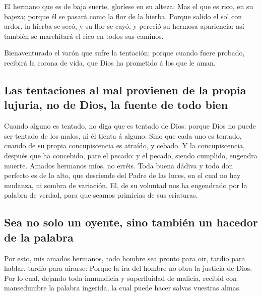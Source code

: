  El hermano que es de baja suerte, gloríese en su alteza:
 Mas el que es rico, en su bajeza; porque él se pasará
como la flor de la hierba.  Porque salido el sol con
ardor, la hierba se secó, y su flor se cayó, y pereció su hermosa
apariencia: así también se marchitará el rico en todos sus caminos.

 Bienaventurado el varón que sufre la tentación; porque
cuando fuere probado, recibirá la corona de vida, que Dios ha prometido
á los que le aman.

\hypertarget{las-tentaciones-al-mal-provienen-de-la-propia-lujuria-no-de-dios-la-fuente-de-todo-bien}{%
\subsection{Las tentaciones al mal provienen de la propia lujuria, no de
Dios, la fuente de todo
bien}\label{las-tentaciones-al-mal-provienen-de-la-propia-lujuria-no-de-dios-la-fuente-de-todo-bien}}

 Cuando alguno es tentado, no diga que es tentado de
Dios: porque Dios no puede ser tentado de los malos, ni él tienta á
alguno:  Sino que cada uno es tentado, cuando de su
propia concupiscencia es atraído, y cebado.  Y la
concupiscencia, después que ha concebido, pare el pecado: y el pecado,
siendo cumplido, engendra muerte.  Amados hermanos míos,
no erréis.  Toda buena dádiva y todo don perfecto es de
lo alto, que desciende del Padre de las luces, en el cual no hay
mudanza, ni sombra de variación.  El, de su voluntad nos
ha engendrado por la palabra de verdad, para que seamos primicias de sus
criaturas.

\hypertarget{sea-no-solo-un-oyente-sino-tambiuxe9n-un-hacedor-de-la-palabra}{%
\subsection{Sea no solo un oyente, sino también un hacedor de la
palabra}\label{sea-no-solo-un-oyente-sino-tambiuxe9n-un-hacedor-de-la-palabra}}

 Por esto, mis amados hermanos, todo hombre sea pronto
para oir, tardío para hablar, tardío para airarse: 
Porque la ira del hombre no obra la justicia de Dios. 
Por lo cual, dejando toda inmundicia y superfluidad de malicia, recibid
con mansedumbre la palabra ingerida, la cual puede hacer salvas vuestras
almas.

